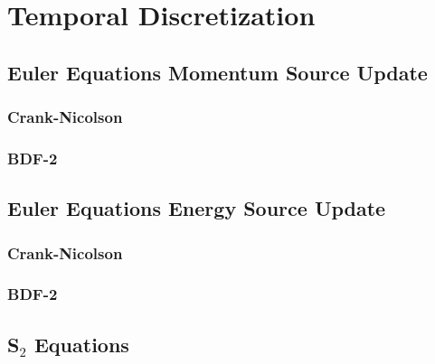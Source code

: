 \documentclass[preprint,12pt]{elsarticle}
\begin{document}
\section{Temporal Discretization}
\subsection{Euler Equations Momentum Source Update}
\subsubsection{Crank-Nicolson}
\subsubsection{BDF-2}

\subsection{Euler Equations Energy Source Update}
\subsubsection{Crank-Nicolson}
\subsubsection{BDF-2}


\subsection{S$_2$ Equations}
\end{document}
